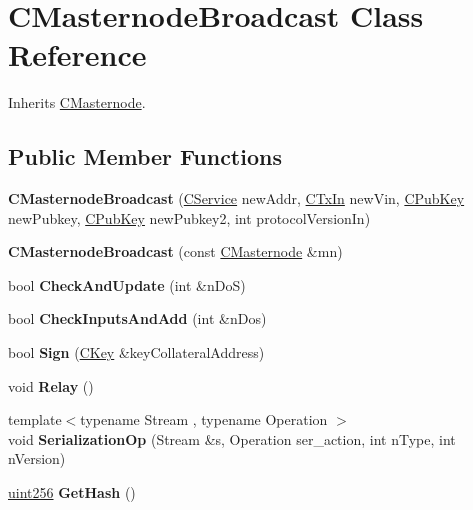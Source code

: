 \hypertarget{class_c_masternode_broadcast}{}\section{C\+Masternode\+Broadcast Class Reference}
\label{class_c_masternode_broadcast}


Inherits \mbox{\hyperlink{class_c_masternode}{C\+Masternode}}.

\subsection*{Public Member Functions}
\begin{DoxyCompactItemize}
\item 
\mbox{\label{class_c_masternode_broadcast_ae74dd3f7c12e22286adf47ea4918048c}} 
{\bfseries C\+Masternode\+Broadcast} (\mbox{\hyperlink{class_c_service}{C\+Service}} new\+Addr, \mbox{\hyperlink{class_c_tx_in}{C\+Tx\+In}} new\+Vin, \mbox{\hyperlink{class_c_pub_key}{C\+Pub\+Key}} new\+Pubkey, \mbox{\hyperlink{class_c_pub_key}{C\+Pub\+Key}} new\+Pubkey2, int protocol\+Version\+In)
\item 
\mbox{\label{class_c_masternode_broadcast_ad85a19b0a20ea5ad6a65bc98fcd40cea}} 
{\bfseries C\+Masternode\+Broadcast} (const \mbox{\hyperlink{class_c_masternode}{C\+Masternode}} \&mn)
\item 
\mbox{\label{class_c_masternode_broadcast_a3692f64d331acb81af066806a685eceb}} 
bool {\bfseries Check\+And\+Update} (int \&n\+DoS)
\item 
\mbox{\label{class_c_masternode_broadcast_af62fbef289c7a262da6fcd6cfadeda3c}} 
bool {\bfseries Check\+Inputs\+And\+Add} (int \&n\+Dos)
\item 
\mbox{\label{class_c_masternode_broadcast_a60496c36bcb74c3f5516faac1a08b376}} 
bool {\bfseries Sign} (\mbox{\hyperlink{class_c_key}{C\+Key}} \&key\+Collateral\+Address)
\item 
\mbox{\label{class_c_masternode_broadcast_a54fc9e822e1524bee8852a0bf6d82736}} 
void {\bfseries Relay} ()
\item 
\mbox{\label{class_c_masternode_broadcast_a6e697696503e9416437067cb33edc084}} 
{\footnotesize template$<$typename Stream , typename Operation $>$ }\\void {\bfseries Serialization\+Op} (Stream \&s, Operation ser\+\_\+action, int n\+Type, int n\+Version)
\item 
\mbox{\label{class_c_masternode_broadcast_a0ada325e5672c4cd178cf02cdc0a7bd5}} 
\mbox{\hyperlink{classuint256}{uint256}} {\bfseries Get\+Hash} ()
\end{DoxyCompactItemize}
